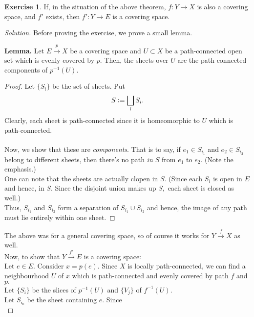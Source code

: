 \documentclass[12pt]{article}
\theoremstyle{definition}
\numberwithin{thm}{section}
\newtheorem{exe}[thm]{Exercise}
\newenvironment{blockquote}
{\begin{mdframed}[skipabove=0pt, skipbelow=0pt, innertopmargin=4pt, innerbottommargin=4pt, bottomline=false,topline=false,rightline=false, linewidth=2pt]}
{\end{mdframed}}
\newenvironment{soln}{\begin{proof}[Solution]}{\end{proof}}
\begin{document}
\begin{exe} \label{exe:alsocoveringspace}
	If, in the situation of the above theorem, $f:Y\to X$ is also a covering space, and $f'$ exists, then $f':Y \to E$ is a covering space. 
\end{exe}
\begin{soln} 
	Before proving the exercise, we prove a small lemma.\\
	\begin{blockquote}
		\textbf{Lemma.} Let $E\overset{p}{\longrightarrow}X$ be a covering space and $U \subset X$ be a path-connected open set which is evenly covered by $p.$ Then, the sheets over $U$ are the path-connected components of $p^{-1}(U).$
		\begin{proof} 
			Let $\{S_i\}$ be the set of sheets. Put 
			\begin{equation*} 
				S \vcentcolon= \bigsqcup_{i} S_i.
			\end{equation*}
			Clearly, each sheet is path-connected since it is homeomorphic to $U$ which is path-connected. \\~\\
			Now, we show that these are \emph{components}. That is to say, if $e_1 \in S_{i_1}$ and $e_2 \in S_{i_2}$ belong to different sheets, then there's no path \emph{in $S$} from $e_1$ to $e_2.$ (Note the emphasis.)\\
			One can note that the sheets are actually clopen in $S.$ (Since each $S_i$ is open in $E$ and hence, in $S.$ Since the disjoint union makes up $S,$ each sheet is closed as well.)\\
			Thus, $S_{i_1}$ and $S_{i_2}$ form a separation of $S_{i_1}\cup S_{i_2}$ and hence, the image of any path must lie entirely within one sheet.
		\end{proof}
	\end{blockquote}
	The above was for a general covering space, so of course it works for $Y \overset{f}{\longrightarrow} X$ as well.\\
	Now, to show that $Y\overset{f'}{\longrightarrow}E$ is a covering space:\\
	Let $e \in E.$ Consider $x = p(e).$ Since $X$ is locally path-connected, we can find a neighbourhood $U$ of $x$ which is path-connected and evenly covered by path $f$ and $p.$\\
	Let $\{S_i\}$ be the slices of $p^{-1}(U)$ and $\{V_j\}$ of $f^{-1}(U).$\\
	Let $S_{i_0}$ be the sheet containing $e.$ Since
	\begin{equation*} 

\end{equation*}
\end{soln}
\end{document}
